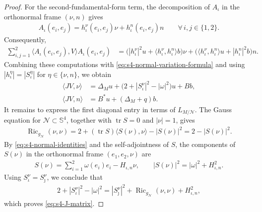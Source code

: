 \documentclass[a4paper,11pt,oneside,reqno]{amsart}
\numberwithin{equation}{section}
\theoremstyle{definition}
\begin{document}
\begin{proof}
    For the second-fundamental-form term, the decomposition
    of $A_\iota$ in the orthonormal frame $(\nu,n)$ gives
    \begin{align*}
        A_\iota(e_i,e_j)
        =h_\iota^\nu(e_i,e_j)\nu+h_\iota^n(e_i,e_j)n
        \qquad\forall\,i,j\in\{1,2\}.
    \end{align*}
    Consequently,
    \begin{align*}
        \sum_{i,j=1}^2
        \langle A_\iota(e_i,e_j),V\rangle A_\iota(e_i,e_j)
        &=
        \bigl(|h_\iota^\nu|^2u+\langle h_\iota^\nu,h_\iota^n\rangle b\bigr)\nu+
        \bigl(\langle h_\iota^\nu,h_\iota^n\rangle u+|h_\iota^n|^2b\bigr)n.
    \end{align*}
    Combining these computations with
    \eqref{eq:s4-normal-variation-formula} and using
    $|h_\iota^\eta|=|S_\iota^\eta|$ for $\eta\in\{\nu,n\}$,
    we obtain
    \begin{align*}
        \langle JV,\nu\rangle
        &=\Delta_Mu+
        \bigl(2+|S_\iota^\nu|^2-|\omega|^2\bigr)u+Bb,\\
        \langle JV,n\rangle
        &=B^*u+(\Delta_M+q)b.
    \end{align*}
    It remains to express the first diagonal entry in
    terms of $L_{M/\mathcal{N}}$. The Gauss equation for
    $\mathcal{N}\subset\mathbb{S}^4$, together with
    $\operatorname{tr}S=0$ and $|\nu|=1$, gives
    \begin{align*}
        \operatorname{Ric}_{g_{\mathcal{N}}}(\nu,\nu)
        =2+(\operatorname{tr}S)\langle S(\nu),\nu\rangle
        -|S(\nu)|^2
        =2-|S(\nu)|^2.
    \end{align*}
    By \eqref{eq:s4-normal-identities} and the
    self-adjointness of $S$, the components of $S(\nu)$
    in the orthonormal frame $(e_1,e_2,\nu)$ are
    \begin{align*}
        S(\nu)=\sum_{i=1}^2\omega(e_i)e_i-H_{\iota,n}\nu,
        \qquad
        |S(\nu)|^2=|\omega|^2+H_{\iota,n}^2.
    \end{align*}
    Using $S_\iota^\nu=S_\jmath^\nu$, we conclude that
    \begin{align*}
        2+|S_\iota^\nu|^2-|\omega|^2
        =|S_\jmath^\nu|^2+
        \operatorname{Ric}_{g_{\mathcal{N}}}(\nu,\nu)
        +H_{\iota,n}^2,
    \end{align*}
    which proves \eqref{eq:s4-J-matrix}.


\end{proof}
\end{document}
